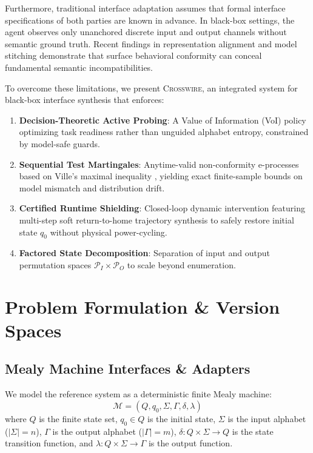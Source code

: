 \documentclass[10pt,twocolumn,letterpaper]{article}
\begin{document}
Furthermore, traditional interface adaptation \cite{autili2004automatic, amram2021adapting} assumes that formal interface specifications of both parties are known in advance. In black-box settings, the agent observes only unanchored discrete input and output channels without semantic ground truth. Recent findings in representation alignment and model stitching \cite{smith2025functional, athanasiadis2026grounding} demonstrate that surface behavioral conformity can conceal fundamental semantic incompatibilities.

To overcome these limitations, we present \textsc{Crosswire}, an integrated system for black-box interface synthesis that enforces:
\begin{enumerate}
    \item \textbf{Decision-Theoretic Active Probing}: A Value of Information (VoI) policy optimizing task readiness rather than unguided alphabet entropy, constrained by model-safe guards.
    \item \textbf{Sequential Test Martingales}: Anytime-valid non-conformity e-processes based on Ville's maximal inequality \cite{ville1939etude, ramdas2023game, howard2021time}, yielding exact finite-sample bounds on model mismatch and distribution drift.
    \item \textbf{Certified Runtime Shielding}: Closed-loop dynamic intervention featuring multi-step soft return-to-home trajectory synthesis to safely restore initial state $q_0$ without physical power-cycling.
    \item \textbf{Factored State Decomposition}: Separation of input and output permutation spaces $\mathcal{P}_I \times \mathcal{P}_O$ to scale beyond enumeration.
\end{enumerate}

\section{Problem Formulation \& Version Spaces}
\label{sec:formulation}

\subsection{Mealy Machine Interfaces \& Adapters}
We model the reference system as a deterministic finite Mealy machine:
\begin{equation}
    \mathcal{M} = (Q, q_0, \Sigma, \Gamma, \delta, \lambda)
\end{equation}
where $Q$ is the finite state set, $q_0 \in Q$ is the initial state, $\Sigma$ is the input alphabet ($|\Sigma| = n$), $\Gamma$ is the output alphabet ($|\Gamma| = m$), $\delta: Q \times \Sigma \to Q$ is the state transition function, and $\lambda: Q \times \Sigma \to \Gamma$ is the output function.
\end{document}
